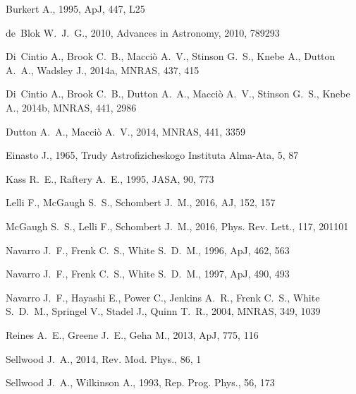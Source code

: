 \begin{thebibliography}{}

Burkert A., 1995, ApJ, 447, L25

de~Blok W.~J.~G., 2010, Advances in Astronomy, 2010, 789293

Di~Cintio A., Brook C.~B., Macci\`o A.~V., Stinson G.~S., Knebe A., Dutton A.~A., Wadsley J., 2014a, MNRAS, 437, 415

Di~Cintio A., Brook C.~B., Dutton A.~A., Macci\`o A.~V., Stinson G.~S., Knebe A., 2014b, MNRAS, 441, 2986

Dutton A.~A., Macci\`o A.~V., 2014, MNRAS, 441, 3359

Einasto J., 1965, Trudy Astrofizicheskogo Instituta Alma-Ata, 5, 87

Kass R.~E., Raftery A.~E., 1995, JASA, 90, 773

Lelli F., McGaugh S.~S., Schombert J.~M., 2016, AJ, 152, 157

McGaugh S.~S., Lelli F., Schombert J.~M., 2016, Phys. Rev. Lett., 117, 201101

Navarro J.~F., Frenk C.~S., White S.~D.~M., 1996, ApJ, 462, 563

Navarro J.~F., Frenk C.~S., White S.~D.~M., 1997, ApJ, 490, 493

Navarro J.~F., Hayashi E., Power C., Jenkins A.~R., Frenk C.~S., White S.~D.~M., Springel V., Stadel J., Quinn T.~R., 2004, MNRAS, 349, 1039

Reines A.~E., Greene J.~E., Geha M., 2013, ApJ, 775, 116

Sellwood J.~A., 2014, Rev. Mod. Phys., 86, 1

Sellwood J.~A., Wilkinson A., 1993, Rep. Prog. Phys., 56, 173

\end{thebibliography}